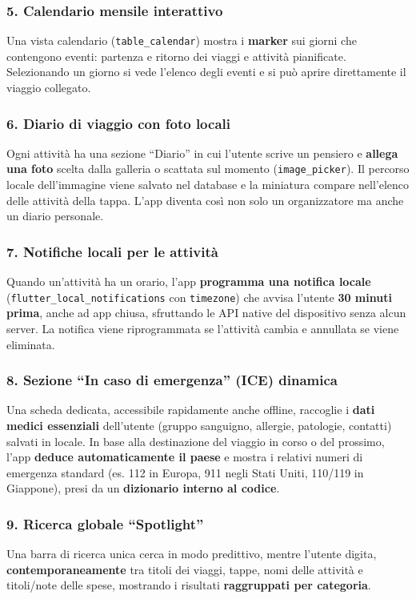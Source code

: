 \documentclass[11pt, a4paper]{article}
\begin{document}
\subsubsection*{5. Calendario mensile interattivo}
Una vista calendario (\texttt{table\_calendar}) mostra i \textbf{marker} sui
giorni che contengono eventi: partenza e ritorno dei viaggi e attività
pianificate. Selezionando un giorno si vede l'elenco degli eventi e si può aprire
direttamente il viaggio collegato.

\subsubsection*{6. Diario di viaggio con foto locali}
Ogni attività ha una sezione ``Diario'' in cui l'utente scrive un pensiero e
\textbf{allega una foto} scelta dalla galleria o scattata sul momento
(\texttt{image\_picker}). Il percorso locale dell'immagine viene salvato nel
database e la miniatura compare nell'elenco delle attività della tappa. L'app
diventa così non solo un organizzatore ma anche un diario personale.

\subsubsection*{7. Notifiche locali per le attività}
Quando un'attività ha un orario, l'app \textbf{programma una notifica locale}
(\texttt{flutter\_local\_notifications} con \texttt{timezone}) che avvisa l'utente
\textbf{30 minuti prima}, anche ad app chiusa, sfruttando le API native del
dispositivo senza alcun server. La notifica viene riprogrammata se l'attività
cambia e annullata se viene eliminata.

\subsubsection*{8. Sezione ``In caso di emergenza'' (ICE) dinamica}
Una scheda dedicata, accessibile rapidamente anche offline, raccoglie i
\textbf{dati medici essenziali} dell'utente (gruppo sanguigno, allergie,
patologie, contatti) salvati in locale. In base alla destinazione del viaggio in
corso o del prossimo, l'app \textbf{deduce automaticamente il paese} e mostra i
relativi numeri di emergenza standard (es. 112 in Europa, 911 negli Stati Uniti,
110/119 in Giappone), presi da un \textbf{dizionario interno al codice}.

\subsubsection*{9. Ricerca globale ``Spotlight''}
Una barra di ricerca unica cerca in modo predittivo, mentre l'utente digita,
\textbf{contemporaneamente} tra titoli dei viaggi, tappe, nomi delle attività e
titoli/note delle spese, mostrando i risultati \textbf{raggruppati per categoria}.
\end{document}
